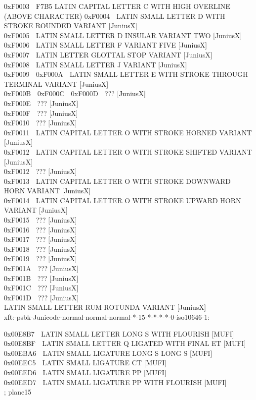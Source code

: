 \documentclass{mwart}
\begin{document}
0xF0003		󰀃	F7B5 LATIN CAPITAL LETTER C WITH HIGH OVERLINE (ABOVE CHARACTER)
0xF0004		󰀄	LATIN SMALL LETTER D WITH STROKE ROUNDED VARIANT [JuniusX]\\
0xF0005		󰀅	LATIN SMALL LETTER D INSULAR VARIANT TWO [JuniusX]\\
0xF0006		󰀆	LATIN SMALL LETTER F VARIANT FIVE [JuniusX]\\
0xF0007		󰀇	LATIN LETTER GLOTTAL STOP VARIANT [JuniusX]\\
0xF0008		󰀈	LATIN SMALL LETTER J VARIANT [JuniusX]\\
0xF0009		󰀉	
0xF000A		󰀊	LATIN SMALL LETTER E WITH STROKE THROUGH TERMINAL VARIANT [JuniusX]\\
0xF000B		󰀋	
0xF000C		󰀌	
0xF000D		󰀍	??? [JuniusX]\\
0xF000E		󰀎	??? [JuniusX]\\
0xF000F		󰀏	??? [JuniusX]\\
0xF0010		󰀐	??? [JuniusX]\\
0xF0011		󰀀	LATIN CAPITAL LETTER O WITH STROKE HORNED VARIANT [JuniusX]\\
0xF0012		󰀑	LATIN CAPITAL LETTER O WITH STROKE SHIFTED VARIANT [JuniusX]\\
0xF0012		󰀒	??? [JuniusX]\\
0xF0013		󰀓	LATIN CAPITAL LETTER O WITH STROKE DOWNWARD HORN VARIANT [JuniusX]\\
0xF0014		󰀔	LATIN CAPITAL LETTER O WITH STROKE UPWARD HORN VARIANT [JuniusX]\\
0xF0015		󰀕	??? [JuniusX]\\
0xF0016		󰀖	??? [JuniusX]\\
0xF0017		󰀗	??? [JuniusX]\\
0xF0018		󰀘	??? [JuniusX]\\
0xF0019		󰀙	??? [JuniusX]\\
0xF001A		󰀚	??? [JuniusX]\\
0xF001B		󰀛	??? [JuniusX]\\
0xF001C		󰀜	??? [JuniusX]\\
0xF001D		󰀝	??? [JuniusX]\\

LATIN SMALL LETTER RUM ROTUNDA VARIANT [JuniusX]\\

xft:-psbk-Junicode-normal-normal-normal-*-15-*-*-*-*-0-iso10646-1:

0x00E8B7  		LATIN SMALL LETTER LONG S WITH FLOURISH [MUFI]\\
0x00E8BF  		LATIN SMALL LETTER Q LIGATED WITH FINAL ET [MUFI]\\
0x00EBA6  		LATIN SMALL LIGATURE LONG S LONG S [MUFI]\\
0x00EEC5  		LATIN SMALL LIGATURE CT [MUFI]\\
0x00EED6  		LATIN SMALL LIGATURE PP [MUFI]\\
0x00EED7  		LATIN SMALL LIGATURE PP WITH FLOURISH [MUFI]\\

; plane15
  



\end{document}
